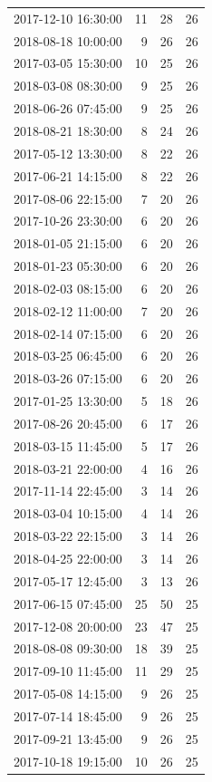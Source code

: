 \begin{tabular}{lrrr}
2017-12-10 16:30:00 & 11 & 28 & 26 \\
2018-08-18 10:00:00 & 9 & 26 & 26 \\
2017-03-05 15:30:00 & 10 & 25 & 26 \\
2018-03-08 08:30:00 & 9 & 25 & 26 \\
2018-06-26 07:45:00 & 9 & 25 & 26 \\
2018-08-21 18:30:00 & 8 & 24 & 26 \\
2017-05-12 13:30:00 & 8 & 22 & 26 \\
2017-06-21 14:15:00 & 8 & 22 & 26 \\
2017-08-06 22:15:00 & 7 & 20 & 26 \\
2017-10-26 23:30:00 & 6 & 20 & 26 \\
2018-01-05 21:15:00 & 6 & 20 & 26 \\
2018-01-23 05:30:00 & 6 & 20 & 26 \\
2018-02-03 08:15:00 & 6 & 20 & 26 \\
2018-02-12 11:00:00 & 7 & 20 & 26 \\
2018-02-14 07:15:00 & 6 & 20 & 26 \\
2018-03-25 06:45:00 & 6 & 20 & 26 \\
2018-03-26 07:15:00 & 6 & 20 & 26 \\
2017-01-25 13:30:00 & 5 & 18 & 26 \\
2017-08-26 20:45:00 & 6 & 17 & 26 \\
2018-03-15 11:45:00 & 5 & 17 & 26 \\
2018-03-21 22:00:00 & 4 & 16 & 26 \\
2017-11-14 22:45:00 & 3 & 14 & 26 \\
2018-03-04 10:15:00 & 4 & 14 & 26 \\
2018-03-22 22:15:00 & 3 & 14 & 26 \\
2018-04-25 22:00:00 & 3 & 14 & 26 \\
2017-05-17 12:45:00 & 3 & 13 & 26 \\
2017-06-15 07:45:00 & 25 & 50 & 25 \\
2017-12-08 20:00:00 & 23 & 47 & 25 \\
2018-08-08 09:30:00 & 18 & 39 & 25 \\
2017-09-10 11:45:00 & 11 & 29 & 25 \\
2017-05-08 14:15:00 & 9 & 26 & 25 \\
2017-07-14 18:45:00 & 9 & 26 & 25 \\
2017-09-21 13:45:00 & 9 & 26 & 25 \\
2017-10-18 19:15:00 & 10 & 26 & 25 \\

\end{tabular}
